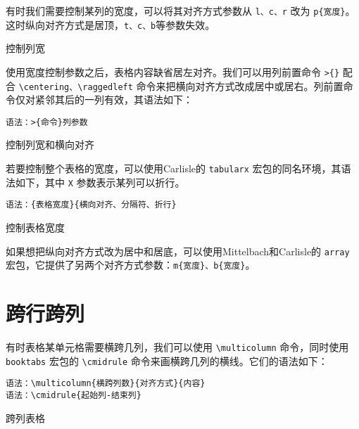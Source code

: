有时我们需要控制某列的宽度，可以将其对齐方式参数从 \texttt{l、c、r} 改为 \verb|p{宽度}|。这时纵向对齐方式是居顶，\texttt{t、c、b}等参数失效。

\begin{example}[h]
\caption{控制列宽}
\label{tab:width_tab}
\end{example}

使用宽度控制参数之后，表格内容缺省居左对齐。我们可以用列前置命令 \verb|>{}| 配合 
\verb|\centering、\raggedleft| 命令来把横向对齐方式改成居中或居右。列前置命令仅对紧邻其后的一列有效，其语法如下：

\verb|语法：>{命令}列参数|


\begin{example}[h]
\caption{控制列宽和横向对齐}
\label{tab:width_aligned_tab}
\end{example}

若要控制整个表格的宽度，可以使用Carlisle\indexCarlisle{}的 \texttt{tabularx} 宏包\citep{Carlisle_1999}的同名环境，其语法如下，其中 \texttt{X} 参数表示某列可以折行。

\verb|语法：{表格宽度}{横向对齐、分隔符、折行}|

\begin{example}[h]
\caption{控制表格宽度}
\label{tab:tabularx_tab}
\end{example}

如果想把纵向对齐方式改为居中和居底，可以使用Mittelbach\indexMittelbach 和Carlisle的 \texttt{array} 宏包\citep{Mittelbach_2009}，它提供了另两个对齐方式参数：\verb|m{宽度}、b{宽度}|。

\section{跨行跨列}

有时表格某单元格需要横跨几列，我们可以使用 \verb|\multicolumn| 命令，同时使用 \texttt{booktabs} 宏包的 \verb|\cmidrule| 命令来画横跨几列的横线。它们的语法如下：

\verb|语法：\multicolumn{横跨列数}{对齐方式}{内容}|\\
\indent\verb|语法：\cmidrule{起始列-结束列}|

\begin{example}[h]
\caption{跨列表格}
\label{tab:multicol_tab}
\end{example}


